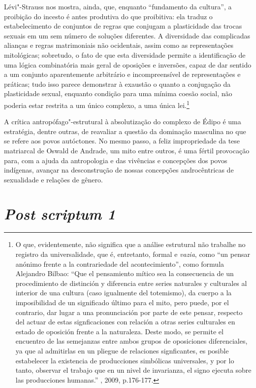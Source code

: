 Lévi"-Strauss nos mostra, ainda, que, enquanto ``fundamento da cultura'',
a proibição do incesto é antes produtiva do que proibitiva: ela traduz o
estabelecimento de conjuntos de regras que conjugam a plasticidade das
trocas sexuais em um sem número de soluções diferentes. A diversidade
das complicadas alianças e regras matrimoniais não ocidentais, assim
como as representações mitológicas; sobretudo, o fato de que esta
diversidade permite a identificação de uma lógica combinatória mais
geral de oposições e inversões, capaz de dar sentido a um conjunto
aparentemente arbitrário e incompreensível de representações e práticas;
tudo isso parece demonstrar à exaustão o quanto a conjugação da
plasticidade sexual, enquanto condição para uma mínima coesão social,
não poderia estar restrita a um único complexo, a uma única
lei.\footnote{O que, evidentemente, não significa que a análise
  estrutural não trabalhe no registro da universalidade, que é,
  entretanto, formal e \emph{vazia}, como ``un pensar anónimo frente a
  la contrariedade del acontecimiento'', como formula Alejandro Bilbao:
  ``Que el pensamiento mítico sea la consecuencia de un procedimiento de
  distinción y diferencia entre series naturales y culturales al
  interior de una cultura (caso igualmente del totemismo), da cuerpo a
  la imposibilidad de un significado último para el mito, pero puede,
  por el contrario, dar lugar a una pronunciación por parte de este
  pensar, respecto del actuar de estas signficaciones con relación a
  otras series culturales en estado de oposición frente a la naturaleza.
  Deste modo, se permite el encuentro de las semejanzas entre ambos
  grupos de oposiciones diferenciales, ya que al admitirlas en un
  pliegue de relaciones signficantes, es posible estabelecer la
  existencia de producciones simbólicas universales, y por lo tanto,
  observar el trabajo que en un nivel de invarianza, el signo ejecuta
  sobre las producciones humanas.'' , 2009, p.176-177.}

A crítica antropófago"-estrutural à absolutização do complexo de Édipo é
uma estratégia, dentre outras, de reavaliar a questão da dominação
masculina no que se refere aos povos autóctones. No mesmo passo, a feliz
impropriedade da tese matriarcal de Oswald de Andrade, um mito entre
outros, é uma fértil provocação para, com a ajuda da antropologia e das
vivências e concepções dos povos indígenas, avançar na desconstrução de
nossas concepções androcêntricas de sexualidade e relações de gênero.

\section{\emph{Post scriptum 1}}

